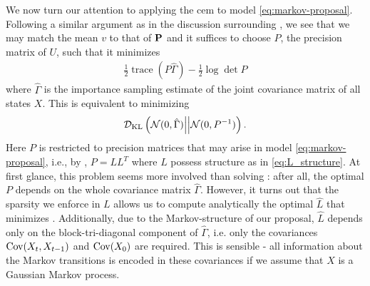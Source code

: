 We now turn our attention to applying the \gls{cem} to model \eqref{eq:markov-proposal}. Following a similar argument as in the discussion surrounding , we see that we may match the mean $v$ to that of $\P$ and it suffices to choose $P$, the precision matrix of $U$, such that it minimizes
\begin{align}
\label{eq:markov_ce_target}
\frac{1}{2} \operatorname{trace} \left( P \hat\Gamma \right) - \frac{1}{2}\log\det P
\end{align}
where $\hat\Gamma$ is the importance sampling estimate of the joint covariance matrix of all states $X$. This is equivalent to minimizing 
$$
\Dkl{\mathcal N(0,\hat\Gamma)}{\mathcal N(0, P^{-1})}.
$$
Here $P$ is restricted to precision matrices that may arise in model \eqref{eq:markov-proposal}, i.e., by , $P = LL^{T}$ where $L$ possess structure as in \eqref{eq:L_structure}. 
At first glance, this problem seems more involved than solving : after all, the optimal $P$ depends on the whole covariance matrix $\hat\Gamma$. 
However, it turns out that the sparsity we enforce in $L$ allows us to compute analytically the optimal $\hat L$  that minimizes 
. Additionally, due to the Markov-structure of our proposal, $\hat L$ depends only on the block-tri-diagonal component of $\hat \Gamma$, i.e. only the covariances $\cov(X_{t}, X_{t-1})$ and $\cov (X_{0})$ are required. This is sensible - all information about the Markov transitions is encoded in these covariances if we assume that $X$ is a Gaussian Markov process.

